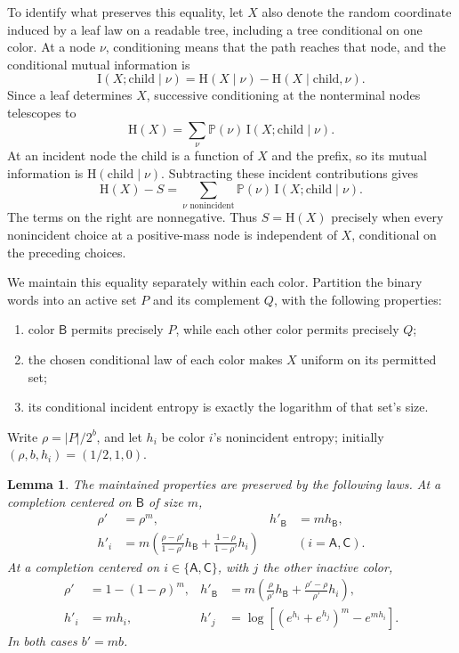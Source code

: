 \documentclass[11pt]{article}
\numberwithin{equation}{section}
\newtheorem{lemma}[theorem]{Lemma}
\theoremstyle{definition}
\theoremstyle{remark}
\begin{document}
To identify what preserves this equality, let \(X\) also denote the
random coordinate induced by a leaf law on a readable tree, including
a tree conditional on one color.
At a node \(\nu\), conditioning means that the path reaches that node,
and the conditional mutual information is
\[
 \mathrm I(X;\text{child}\mid\nu)
 =\mathrm H(X\mid\nu)-\mathrm H(X\mid\text{child},\nu).
\]
Since a leaf determines \(X\), successive conditioning at the
nonterminal nodes telescopes to
\[
 \mathrm H(X)=\sum_\nu\mathbb P(\nu)\,
                  \mathrm I(X;\text{child}\mid\nu).
\]
At an incident node the child is a function of \(X\) and the prefix,
so its mutual information is \(\mathrm H(\text{child}\mid\nu)\).
Subtracting these incident contributions gives
\begin{equation}\label{eq:information-leakage}
 \mathrm H(X)-S
  =\sum_{\nu\text{ nonincident}}
       \mathbb P(\nu)\,\mathrm I(X;\text{child}\mid\nu).
\end{equation}
The terms on the right are nonnegative.  Thus \(S=\mathrm H(X)\) precisely
when every nonincident choice at a positive-mass node is independent
of \(X\), conditional on the preceding choices.

We maintain this equality separately within each color.
Partition the binary words into an active set \(P\) and its complement
\(Q\), with the following properties:
\begin{enumerate}
 \item color \(\mathsf B\) permits precisely \(P\), while each other color
 permits precisely \(Q\);
 \item the chosen conditional law of each color makes \(X\) uniform on
 its permitted set;
 \item its conditional incident entropy is exactly the logarithm of
 that set's size.
\end{enumerate}
Write \(\rho=|P|/2^b\), and let \(h_i\) be color \(i\)'s nonincident
entropy; initially \((\rho,b,h_i)=(1/2,1,0)\).

\begin{lemma}\label{lem:uniform-update}
The maintained properties are preserved by the following laws.
At a completion centered on \(\mathsf B\) of size \(m\),
\begin{align}
 \rho'&=\rho^m,& h'_{\mathsf B}&=m h_{\mathsf B}, \label{eq:minus-rho}\\
 h'_i&=
 m\left(\frac{\rho-\rho'}{1-\rho'}h_{\mathsf B}
         +\frac{1-\rho}{1-\rho'}h_i\right)
       &&(i=\mathsf A,\mathsf C). \label{eq:minus-h}
\end{align}
At a completion centered on \(i\in\{\mathsf A,\mathsf C\}\), with \(j\) the
other inactive color,
\begin{align}
 \rho'&=1-(1-\rho)^m,&
 h'_{\mathsf B}&=
 m\left(\frac{\rho}{\rho'}h_{\mathsf B}
       +\frac{\rho'-\rho}{\rho'}h_i\right), \label{eq:plus-rho}\\
 h'_i&=mh_i,&
 h'_j&=\log\left[(e^{h_i}+e^{h_j})^m-e^{mh_i}\right].
 \label{eq:plus-h}
\end{align}
In both cases \(b'=mb\).
\end{lemma}
\end{document}

